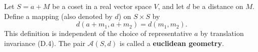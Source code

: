 Let $S = a + M$ be a coset in a real vector space $V$, and let $d$ be a distance on $M$. Define a mapping (also denoted by $d$) on $S \times S$ by
$$d(a + m_1, a + m_2) = d(m_1, m_2).$$
This definition is independent of the choice of representative $a$ by translation invariance (D.4). The pair $\mathcal{A}(S, d)$ is called a \textbf{euclidean geometry}.
